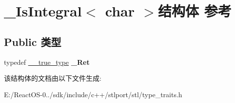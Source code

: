 \hypertarget{struct___is_integral_3_01char_01_4}{}\section{\+\_\+\+Is\+Integral$<$ char $>$结构体 参考}
\label{struct___is_integral_3_01char_01_4}
\subsection*{Public 类型}
\begin{DoxyCompactItemize}
\item 
\mbox{\label{struct___is_integral_3_01char_01_4_a0e44317970093b69c16cf8455f0e50cf}} 
typedef \hyperlink{struct____true__type}{\+\_\+\+\_\+true\+\_\+type} {\bfseries \+\_\+\+Ret}
\end{DoxyCompactItemize}


该结构体的文档由以下文件生成\+:\begin{DoxyCompactItemize}
\item 
E\+:/\+React\+O\+S-\/0../sdk/include/c++/stlport/stl/type\+\_\+traits.\+h\end{DoxyCompactItemize}
